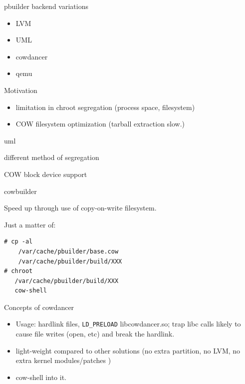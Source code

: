 \documentclass[dvipdfm,17pt,times]{beamer}
\begin{document}
\begin{frame}{pbuilder backend variations}

\begin{minipage}{0.35\hsize}
  \begin{itemize}
  \item LVM
  \item UML
  \item cowdancer
  \item qemu
 \end{itemize}
\end{minipage}
\begin{minipage}{0.6\hsize}
 \colorbox{titleback}{
\begin{minipage}{1\hsize}
 Motivation
\begin{itemize}
 \item limitation in chroot segregation (process space, filesystem)
 \item COW filesystem optimization (tarball extraction slow.)
\end{itemize}
\end{minipage}
}
\end{minipage}
\end{frame}

\begin{frame}{uml}
 
 different method of segregation
 
 COW block device support

\end{frame}

\begin{frame}[containsverbatim]{cowbuilder}
 
 Speed up through use of copy-on-write filesystem.

 Just a matter of:

\begin{verbatim}
# cp -al
    /var/cache/pbuilder/base.cow 
    /var/cache/pbuilder/build/XXX
# chroot 
   /var/cache/pbuilder/build/XXX
   cow-shell 
\end{verbatim}
\end{frame}

\begin{frame}{Concepts of cowdancer}
 \begin{itemize}
  \item Usage: hardlink files, 
	\texttt{LD\_PRELOAD} libcowdancer.so;
	trap libc calls likely to cause file writes
	(open, etc) and break the hardlink.
  \item light-weight compared to other solutions (no extra partition, no
	LVM, no extra kernel modules/patches )
  \item cow-shell into it.
 \end{itemize}
\end{frame}
\end{document}
